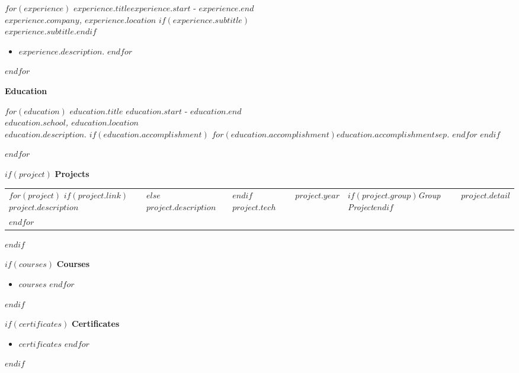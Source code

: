 \documentclass[]{$documentclass$}
\newcommand\mytitle[1]{\vspace{5mm}\textbf{\Large #1}\par\vspace{5pt}}
\def\titleeducation{Utdanning}
\def\titleprojects{Prosjekter}
\def\groupproject{Gruppeprosjekt}
\def\titlecourses{Kurs}
\def\titlecertificates{Sertifikater}
\def\titleeducation{Education}
\def\titleprojects{Projects}
\def\groupproject{Group Project}
\def\titlecourses{Courses}
\def\titlecertificates{Certificates}
\begin{document}
{    $for(experience)$
        \textbf{$experience.title$}\hfill $experience.start$ - $experience.end$\\
        \textit{$experience.company$, $experience.location$}
        $if(experience.subtitle)$\\$experience.subtitle$.$endif$
        \begin{itemize}
        $for(experience.description)$
            \item $experience.description$.
        $endfor$
        \end{itemize}
        \par\vspace{\itemspacing}
    $endfor$
    \par\vspace{-\itemspacing}

    \mytitle{\titleeducation}
    $for(education)$
        \textbf{$education.title$} \hfill $education.start$ - $education.end$\\
        \textit{$education.school$, $education.location$}\\
        $education.description$.
        $if(education.accomplishment)$
        \textit{$for(education.accomplishment)$$education.accomplishment$$sep$. $endfor$}
        $endif$
        \par\vspace{\itemspacing}
    $endfor$
    \par\vspace{-\itemspacing}

    $if(project)$
    \mytitle{\titleprojects}
    \begin{tabular}{@{\hspace{0pt}}lllll}
        $for(project)$
            $if(project.link)$
                \href{$project.link$}{$project.description$} &
            $else$
                $project.description$ & 
            $endif$
            \texttt{$project.tech$} & 
            $project.year$ & 
            $if(project.group)$\textit{\groupproject}$endif$ &
            \textit{$project.detail$}\\
        $endfor$
    \end{tabular}
    $endif$

    \begin{minipage}[t]{.49\textwidth}
        $if(courses)$
        \mytitle{\titlecourses}
        \begin{itemize}
        $for(courses)$
            \item $courses$
        $endfor$
        \end{itemize}
        $endif$
    \end{minipage}\hfill
    \begin{minipage}[t]{.49\textwidth}
        $if(certificates)$
        \mytitle{\titlecertificates}
        \begin{itemize}
        $for(certificates)$
            \item $certificates$
        $endfor$
        \end{itemize}
        $endif$
    \end{minipage}

}
\end{document}
